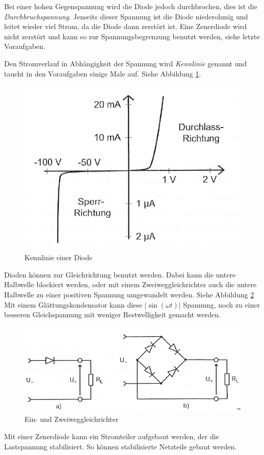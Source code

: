 Bei einer hohen Gegenspannung wird die Diode jedoch durchbrochen, dies ist die
\emph{Durchbruchspannung}. Jenseits dieser Spannung ist die Diode niederohmig
und leitet wieder viel Strom, da die Diode dann zerstört ist. Eine Zenerdiode
wird nicht zerstört und kann so zur Spannungsbegrenzung benutzt werden, siehe
letzte Voraufgaben.

Den Stromverlauf in Abhängigkeit der Spannung wird \emph{Kennlinie} genannt und
taucht in den Voraufgaben einige Male auf. Siehe Abbildung \ref{fig:2.2}.

\begin{figure}[h]
	\centering
	\caption{%
		Kennlinie einer Diode \cite[Abbildung~2.2]{physik313-Anleitung}
	}
	\label{fig:2.2}
	\includegraphics[width=.45\linewidth]{Bilder_aus_Anleitung/2-2.png}
\end{figure}

Dioden können zur Gleichrichtung benutzt werden. Dabei kann die untere
Halbwelle blockiert werden, oder mit einem Zweiweggleichrichter auch die untere
Halbwelle zu einer positiven Spannung umgewandelt werden. Siehe Abbildung
\ref{fig:2.4} Mit einem Glättungskondensator kann diese $|\sin(\omega t)|$
Spannung, noch zu einer besseren Gleichspannung mit weniger Restwelligkeit
gemacht werden.

\begin{figure}[h]
	\centering
	\caption{%
		Ein- und Zweiweggleichrichter \cite[Abbildung~2.4]{physik313-Anleitung}
	}
	\label{fig:2.4}
	\includegraphics[width=.7\linewidth]{Bilder_aus_Anleitung/2-4.png}
\end{figure}

Mit einer Zenerdiode kann ein Stromteiler aufgebaut werden, der die
Lastspannung stabilisiert. So können stabilisierte Netzteile gebaut werden.

